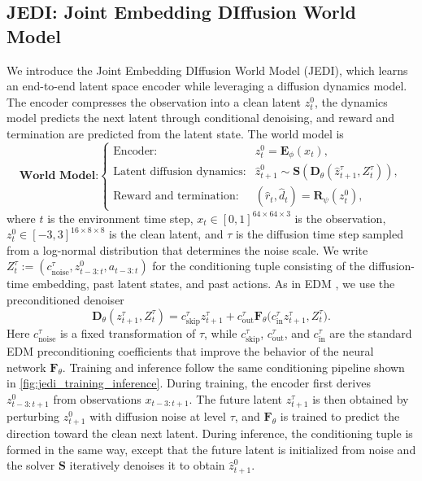 \documentclass{article}
\begin{document}
\subsection{JEDI: Joint Embedding DIffusion World Model}
We introduce the Joint Embedding DIffusion World Model (JEDI), which learns an end-to-end latent space encoder while leveraging a diffusion dynamics model. The encoder compresses the observation into a clean latent $z_t^0$, the dynamics model predicts the next latent through conditional denoising, and reward and termination are predicted from the latent state. The world model is
\begin{equation}
\textbf{World Model:}
    \begin{cases}
        \text{Encoder:} & z_t^0 = \mathbf{E}_{\phi}(x_t), \\
        \text{Latent diffusion dynamics:} & \hat{z}_{t+1}^0 \sim \mathbf{S}(\mathbf{D}_{\theta}(\hat{z}_{t+1}^\tau,Z_t^\tau)),\\
        \text{Reward and termination:} & (\hat{r}_t, \hat{d}_t) = \mathbf{R}_{\psi}(z_t^0),
    \end{cases}
\label{eq:models}
\end{equation}
where $t$ is the environment time step, $x_t \in [0,1]^{64\times64\times3}$ is the observation, $z_t^0 \in [-3,3]^{16\times8\times8}$ is the clean latent, and $\tau$ is the diffusion time step sampled from a log-normal distribution that determines the noise scale. We write $Z_t^\tau := (c_{\mathrm{noise}}^\tau, z^0_{t-3:t}, a_{t-3:t})$ for the conditioning tuple consisting of the diffusion-time embedding, past latent states, and past actions. As in EDM \citep{karras2022EDM}, we use the preconditioned denoiser
\begin{equation}
\mathbf{D}_{\theta}(z_{t+1}^\tau, Z_t^\tau)=c_{\mathrm{skip}}^\tau z_{t+1}^\tau+c_{\mathrm{out}}^\tau\mathbf{F}_{\theta}\bigl(c_{\mathrm{in}}^\tau z_{t+1}^\tau, Z_t^\tau\bigr).
\end{equation}
Here $c_{\mathrm{noise}}^\tau$ is a fixed transformation of $\tau$, while $c_{\mathrm{skip}}^\tau$, $c_{\mathrm{out}}^\tau$, and $c_{\mathrm{in}}^\tau$ are the standard EDM preconditioning coefficients that improve the behavior of the neural network $\mathbf{F}_{\theta}$. Training and inference follow the same conditioning pipeline shown in \cref{fig:jedi_training_inference}. During training, the encoder first derives $z_{t-3:t+1}^0$ from observations $x_{t-3:t+1}$. The future latent $z_{t+1}^\tau$ is then obtained by perturbing $z_{t+1}^0$ with diffusion noise at level $\tau$, and $\mathbf{F}_{\theta}$ is trained to predict the direction toward the clean next latent. During inference, the conditioning tuple is formed in the same way, except that the future latent is initialized from noise and the solver $\mathbf{S}$ iteratively denoises it to obtain $\hat{z}_{t+1}^0$.
\end{document}
